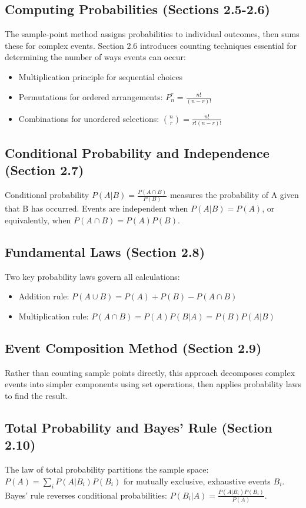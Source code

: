 \documentclass[12pt]{article}
\begin{document}
\subsection*{Computing Probabilities (Sections 2.5-2.6)}
The sample-point method assigns probabilities to individual outcomes, then sums these for complex events. Section 2.6 introduces counting techniques essential for determining the number of ways events can occur:
\begin{itemize}
\item Multiplication principle for sequential choices
\item Permutations for ordered arrangements: $P_n^r = \frac{n!}{(n-r)!}$
\item Combinations for unordered selections: $\binom{n}{r} = \frac{n!}{r!(n-r)!}$
\end{itemize}

\subsection*{Conditional Probability and Independence (Section 2.7)}
Conditional probability $P(A|B) = \frac{P(A \cap B)}{P(B)}$ measures the probability of A given that B has occurred. Events are independent when $P(A|B) = P(A)$, or equivalently, when $P(A \cap B) = P(A)P(B)$.

\subsection*{Fundamental Laws (Section 2.8)}
Two key probability laws govern all calculations:
\begin{itemize}
\item Addition rule: $P(A \cup B) = P(A) + P(B) - P(A \cap B)$
\item Multiplication rule: $P(A \cap B) = P(A)P(B|A) = P(B)P(A|B)$
\end{itemize}

\subsection*{Event Composition Method (Section 2.9)}
Rather than counting sample points directly, this approach decomposes complex events into simpler components using set operations, then applies probability laws to find the result.

\subsection*{Total Probability and Bayes' Rule (Section 2.10)}
The law of total probability partitions the sample space: $P(A) = \sum_i P(A|B_i)P(B_i)$ for mutually exclusive, exhaustive events $B_i$. Bayes' rule reverses conditional probabilities: $P(B_i|A) = \frac{P(A|B_i)P(B_i)}{P(A)}$. 
\end{document}

